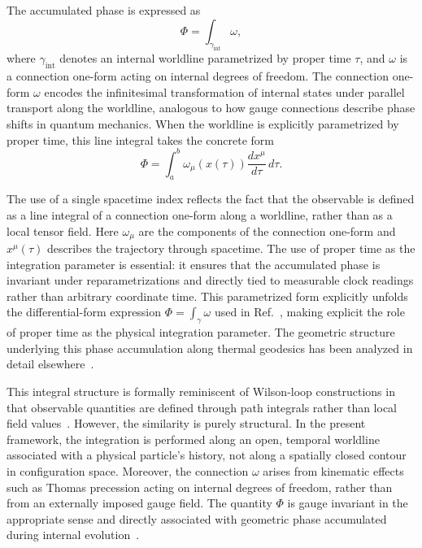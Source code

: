 \documentclass[%
 reprint,
 amsmath,amssymb,
 aps,
 prb,
]{revtex4-2}
\numberwithin{equation}{section}
\begin{document}
The accumulated phase is expressed as
\begin{equation}
\Phi = \int_{\gamma_{\mathrm{int}}} \omega,
\end{equation}
where $\gamma_{\mathrm{int}}$ denotes an internal worldline parametrized by proper time $\tau$, and $\omega$ is a connection one-form acting on internal degrees of freedom. The connection one-form $\omega$ encodes the infinitesimal transformation of internal states under parallel transport along the worldline, analogous to how gauge connections describe phase shifts in quantum mechanics. When the worldline is explicitly parametrized by proper time, this line integral takes the concrete form
\begin{equation}
\Phi = \int_a^b \omega_\mu(x(\tau)) \frac{dx^\mu}{d\tau} \, d\tau.
\end{equation}


The use of a single spacetime index reflects the fact that the observable is defined as a line integral of a connection one-form along a worldline, rather than as a local tensor field. Here $\omega_\mu$ are the components of the connection one-form and $x^\mu(\tau)$ describes the trajectory through spacetime. The use of proper time as the integration parameter is essential: it ensures that the accumulated phase is invariant under reparametrizations and directly tied to measurable clock readings rather than arbitrary coordinate time. This parametrized form explicitly unfolds the differential-form expression $\Phi = \int_\gamma \omega$ used in Ref.~\cite{hanamura18135855}, making explicit the role of proper time as the physical integration parameter. The geometric structure underlying this phase accumulation along thermal geodesics has been analyzed in detail elsewhere~\cite{hanamura18067760,hanamura18135855}.

This integral structure is formally reminiscent of Wilson-loop constructions in that observable quantities are defined through path integrals rather than local field values~\cite{Wilson1974}. However, the similarity is purely structural. In the present framework, the integration is performed along an open, temporal worldline associated with a physical particle's history, not along a spatially closed contour in configuration space. Moreover, the connection $\omega$ arises from kinematic effects such as Thomas precession acting on internal degrees of freedom, rather than from an externally imposed gauge field. The quantity $\Phi$ is gauge invariant in the appropriate sense and directly associated with geometric phase accumulated during internal evolution~\cite{WuYang1975,Berry1984}.
\end{document}
